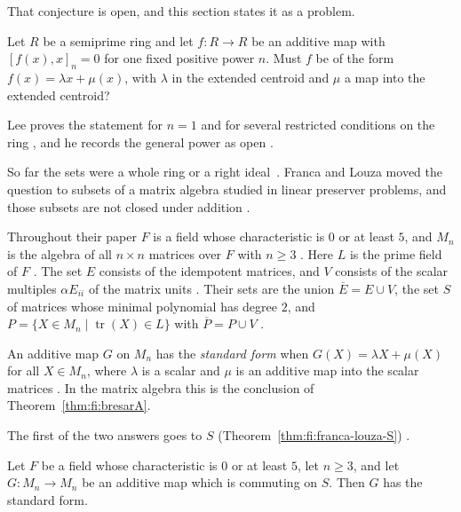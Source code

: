 That conjecture is open, and this section states it as a problem.

\begin{problem}\label{prob:open:commuting}
Let $R$ be a semiprime ring and let $f\colon R\to R$ be an additive map with
$[f(x),x]_n=0$ for one fixed positive power $n$.
Must $f$ be of the form $f(x)=\lambda x+\mu(x)$, with $\lambda$ in the extended
centroid and $\mu$ a map into the extended centroid?
\end{problem}

Lee proves the statement for $n=1$ and for several restricted conditions on
the ring \cite[Theorem~L, p.~334]{LeeTK1997Centralizing}, and he records the
general power as open \cite[p.~334]{LeeTK1997Centralizing}.

So far the sets were a whole ring or a right ideal~\cite[p.~2540]{FrancaLouza2024}. Franca and Louza moved the
question to subsets of a matrix algebra studied in linear preserver problems,
and those subsets are not closed under addition
\cite[p.~2540]{FrancaLouza2024}.

Throughout their paper $F$ is a field whose characteristic is $0$ or at least
$5$, and $M_n$ is the algebra of all $n\times n$ matrices over $F$ with
$n\ge3$ \cite[p.~2541]{FrancaLouza2024}. Here $L$ is the prime field of $F$
\cite[p.~2541]{FrancaLouza2024}. The set $E$ consists of the idempotent
matrices, and $V$ consists of the scalar multiples $\alpha E_{ii}$ of the
matrix units \cite[p.~2541]{FrancaLouza2024}. Their sets are the union
$\overline{E}=E\cup V$, the set $S$ of matrices whose minimal polynomial has
degree $2$, and $P=\{X\in M_n\mid\operatorname{tr}(X)\in L\}$ with
$\overline{P}=P\cup V$ \cite[p.~2541]{FrancaLouza2024}.

An additive map $G$ on $M_n$ has the \emph{standard form} when $G(X)=\lambda
X+\mu(X)$ for all $X\in M_n$, where $\lambda$ is a scalar and $\mu$ is an
additive map into the scalar matrices \cite[p.~2540]{FrancaLouza2024}. In the
matrix algebra this is the conclusion of Theorem~\ref{thm:fi:bresarA}.

The first of the two answers goes to $S$ (Theorem~\ref{thm:fi:franca-louza-S})
\cite[p.~2550]{FrancaLouza2024}.

\begin{theorem}\label{thm:fi:franca-louza-S}
Let $F$ be a field whose characteristic is $0$ or at least $5$, let $n\ge3$, and let
$G\colon M_n\to M_n$ be an additive map which is commuting on $S$. Then $G$ has the
standard form.
\end{theorem}

